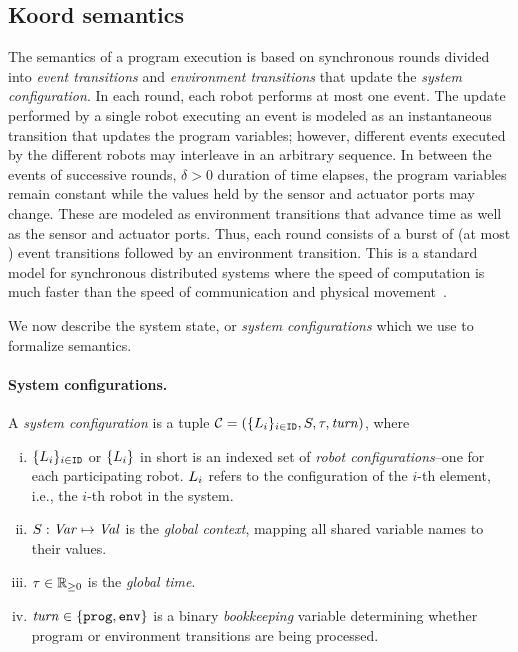 \subsection{Koord semantics}
\label{sec:configs}

The semantics of a \lgname program execution is based on synchronous rounds divided into \emph{event transitions} and \emph{environment transitions} that update the \emph{system configuration}.
In each round, each robot performs at most one event.
The update performed by a single robot executing an event is modeled as an instantaneous transition that updates the program variables; however, different events executed by the different robots may interleave in an arbitrary sequence.
In between the events of successive rounds, $\delta>0$ duration of time elapses, the program variables remain constant while the values held by the sensor and actuator ports may change. 
These are modeled as environment transitions that advance time as well as the sensor and actuator ports.
%
Thus, each round consists of a burst of (at most \NMAX) event transitions followed by an environment transition. This is a standard model for synchronous distributed systems where the speed of computation is much faster than the speed of communication and physical movement~\cite{lynch1996a,attiyawelch}. 

We now describe the system state, or \emph{system configurations} which we use to formalize \lgname semantics.

\paragraph{System configurations.}

A \emph{system configuration} is a tuple $\mathcal{C} = (\{L_{i}\}_{i\in\texttt{ID}},{S},\tau,\mathit{turn})$, where

\begin{enumerate}[(i)]
\item $\{L_{i}\}_{i\in\texttt{ID}}$ or $\{L_{i}\}$ in short is an indexed set of \emph{robot configurations}--one for each participating robot.
      $L_{i}$ refers to the configuration of the $i$-th element, i.e., the $i$-th robot in the system.
\item ${S} : \mathit{Var} \mapsto \mathit{Val}$ is the {\em global context\/}, mapping all shared variable names to their values.
\item $\tau\in \nnreals$ is the {\em global time\/}.
\item $\mathit{turn}\in\{\mathtt{prog},\mathtt{env}\}$ is a binary \emph{bookkeeping} variable determining whether program or environment transitions are being processed.
\end{enumerate}

